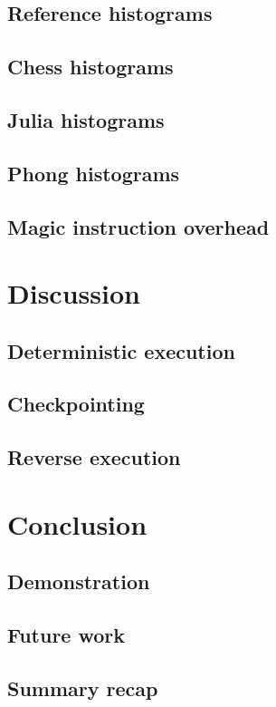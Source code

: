 \documentclass{beamer}
\begin{document}
	\subsection{Reference histograms}
	
	\subsection{Chess histograms}
	
	\subsection{Julia histograms}
	
	\subsection{Phong histograms}
	
	\subsection{Magic instruction overhead}
	

	\section{Discussion}
	\subsection{Deterministic execution}
	
	\subsection{Checkpointing}
	
	\subsection{Reverse execution}
	

	\section{Conclusion}
	\subsection{Demonstration}
	
	\subsection{Future work}
	
	\subsection{Summary recap}
	

	

	

	
\end{document}
